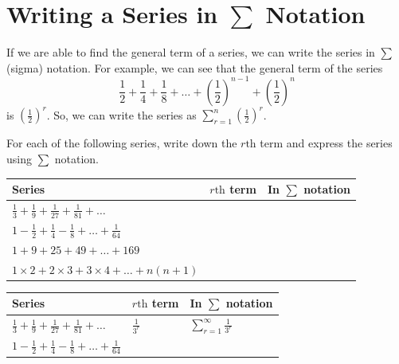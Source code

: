 \documentclass[11pt,a4paper]{book}
\begin{document}
\newpage

\section{Writing a Series in $\sum$ Notation}

If we are able to find the general term of a series, we can write
the series in $\sum$ (sigma) notation. For example, we can see that
the general term of the series 
\[
\frac{1}{2}+\frac{1}{4}+\frac{1}{8}+\ldots+\left(\frac{1}{2}\right)^{n-1}+\left(\frac{1}{2}\right)^{n}
\]
 is ${\displaystyle \left(\frac{1}{2}\right)^{r}}$. So, we can write
the series as ${\displaystyle \sum_{r=1}^{n}\left(\frac{1}{2}\right)^{r}}$.

\begin{example}

For each of the following series, write down the $r\text{th}$ term
and express the series using $\sum$ notation.

\setlength{\extrarowheight}{12pt}

\begin{tabular}{|>{\centering}p{7cm}|>{\centering}p{3cm}|>{\centering}p{3cm}|}
\hline 
Series

\medskip{} & $r\text{th}$ term & In $\sum$ notation\tabularnewline
\hline 
${\displaystyle \frac{1}{3}+\frac{1}{9}+\frac{1}{27}+\frac{1}{81}}+\ldots$

\medskip{} &  & \tabularnewline
\hline 
${\displaystyle 1-\frac{1}{2}+\frac{1}{4}-\frac{1}{8}+\ldots+\frac{1}{64}}$

\medskip{} &  & \tabularnewline
\hline 
$1+9+25+49+\ldots+169$

\medskip{} &  & \tabularnewline
\hline 
$1\times2+2\times3+3\times4+\ldots+n\left(n+1\right)$

\medskip{} &  & \tabularnewline
\hline 
\end{tabular}

\bigskip

\Solution

\medskip

\setlength{\extrarowheight}{12pt}

\begin{tabular}{|>{\centering}p{7cm}|>{\centering}p{3cm}|>{\centering}p{3cm}|}
\hline 
Series

\medskip{} & $r\text{th}$ term & In $\sum$ notation\tabularnewline
\hline 
${\displaystyle \frac{1}{3}+\frac{1}{9}+\frac{1}{27}+\frac{1}{81}}+\ldots$

\medskip{} & ${\displaystyle \frac{1}{3^{r}}}$ & ${\displaystyle \sum_{r=1}^{\infty}\frac{1}{3^{r}}}$\tabularnewline
\hline 
${\displaystyle 1-\frac{1}{2}+\frac{1}{4}-\frac{1}{8}+\ldots+\frac{1}{64}}$


\end{tabular}
\end{example}
\end{document}
